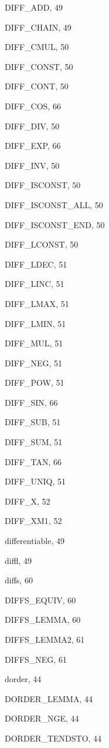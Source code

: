 \begin{theindex}
  \item {\ptt DIFF\_ADD}, 49
  \item {\ptt DIFF\_CHAIN}, 49
  \item {\ptt DIFF\_CMUL}, 50
  \item {\ptt DIFF\_CONST}, 50
  \item {\ptt DIFF\_CONT}, 50
  \item {\ptt DIFF\_COS}, 66
  \item {\ptt DIFF\_DIV}, 50
  \item {\ptt DIFF\_EXP}, 66
  \item {\ptt DIFF\_INV}, 50
  \item {\ptt DIFF\_ISCONST}, 50
  \item {\ptt DIFF\_ISCONST\_ALL}, 50
  \item {\ptt DIFF\_ISCONST\_END}, 50
  \item {\ptt DIFF\_LCONST}, 50
  \item {\ptt DIFF\_LDEC}, 51
  \item {\ptt DIFF\_LINC}, 51
  \item {\ptt DIFF\_LMAX}, 51
  \item {\ptt DIFF\_LMIN}, 51
  \item {\ptt DIFF\_MUL}, 51
  \item {\ptt DIFF\_NEG}, 51
  \item {\ptt DIFF\_POW}, 51
  \item {\ptt DIFF\_SIN}, 66
  \item {\ptt DIFF\_SUB}, 51
  \item {\ptt DIFF\_SUM}, 51
  \item {\ptt DIFF\_TAN}, 66
  \item {\ptt DIFF\_UNIQ}, 51
  \item {\ptt DIFF\_X}, 52
  \item {\ptt DIFF\_XM1}, 52
  \item {\ptt differentiable}, 49
  \item {\ptt diffl}, 49
  \item {\ptt diffs}, 60
  \item {\ptt DIFFS\_EQUIV}, 60
  \item {\ptt DIFFS\_LEMMA}, 60
  \item {\ptt DIFFS\_LEMMA2}, 61
  \item {\ptt DIFFS\_NEG}, 61
  \item {\ptt dorder}, 44
  \item {\ptt DORDER\_LEMMA}, 44
  \item {\ptt DORDER\_NGE}, 44
  \item {\ptt DORDER\_TENDSTO}, 44


\end{theindex}
